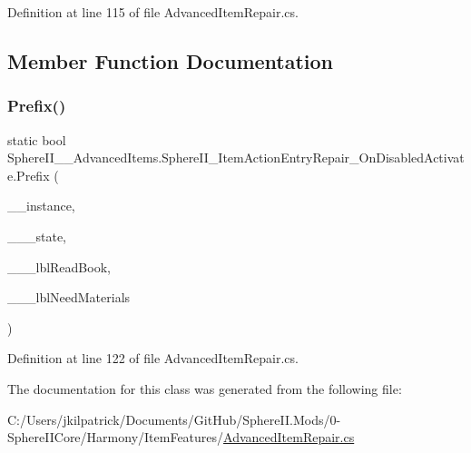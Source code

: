 Definition at line 115 of file Advanced\+Item\+Repair.\+cs.



\subsection{Member Function Documentation}
\mbox{\label{class_sphere_i_i_____advanced_items_1_1_sphere_i_i___item_action_entry_repair___on_disabled_activate_a535205610eeae2d2e3594decce98e4bc}} 
\subsubsection{\texorpdfstring{Prefix()}{Prefix()}}
{\footnotesize\ttfamily static bool Sphere\+I\+I\+\_\+\+\_\+\+Advanced\+Items.\+Sphere\+I\+I\+\_\+\+Item\+Action\+Entry\+Repair\+\_\+\+On\+Disabled\+Activate.\+Prefix (\begin{DoxyParamCaption}\item[{Item\+Action\+Entry\+Repair}]{\+\_\+\+\_\+instance,  }\item[{\mbox{\hyperlink{class_sphere_i_i_____advanced_items_1_1_sphere_i_i___item_action_entry_repair___on_disabled_activate_a152c4b5cb32c084776f2539575c48ac4}{State\+Types}}}]{\+\_\+\+\_\+\+\_\+state,  }\item[{string}]{\+\_\+\+\_\+\+\_\+lbl\+Read\+Book,  }\item[{string}]{\+\_\+\+\_\+\+\_\+lbl\+Need\+Materials }\end{DoxyParamCaption})\hspace{0.3cm}{\ttfamily [static]}}



Definition at line 122 of file Advanced\+Item\+Repair.\+cs.



The documentation for this class was generated from the following file\+:\begin{DoxyCompactItemize}
\item 
C\+:/\+Users/jkilpatrick/\+Documents/\+Git\+Hub/\+Sphere\+I\+I.\+Mods/0-\/\+Sphere\+I\+I\+Core/\+Harmony/\+Item\+Features/\mbox{\hyperlink{_advanced_item_repair_8cs}{Advanced\+Item\+Repair.\+cs}}\end{DoxyCompactItemize}
